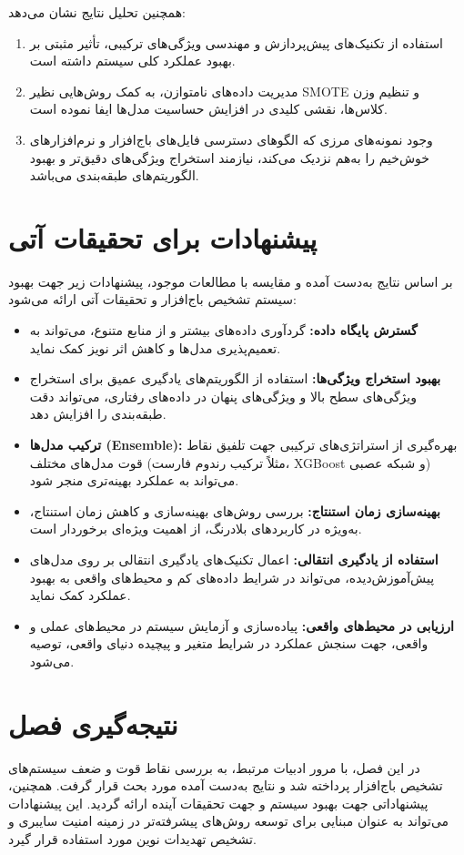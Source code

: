 همچنین تحلیل نتایج نشان می‌دهد:
\begin{enumerate}
    \item استفاده از تکنیک‌های پیش‌پردازش و مهندسی ویژگی‌های ترکیبی، تأثیر مثبتی بر بهبود عملکرد کلی سیستم داشته است.
    \item مدیریت داده‌های نامتوازن، به کمک روش‌هایی نظیر SMOTE و تنظیم وزن کلاس‌ها، نقشی کلیدی در افزایش حساسیت مدل‌ها ایفا نموده است.
    \item وجود نمونه‌های مرزی که الگوهای دسترسی فایل‌های باج‌افزار و نرم‌افزارهای خوش‌خیم را به‌هم نزدیک می‌کند، نیازمند استخراج ویژگی‌های دقیق‌تر و بهبود الگوریتم‌های طبقه‌بندی می‌باشد.
\end{enumerate}

\section{پیشنهادات برای تحقیقات آتی}
بر اساس نتایج به‌دست آمده و مقایسه با مطالعات موجود، پیشنهادات زیر جهت بهبود سیستم تشخیص باج‌افزار و تحقیقات آتی ارائه می‌شود:
\begin{itemize}
    \item \textbf{گسترش پایگاه داده:} گردآوری داده‌های بیشتر و از منابع متنوع، می‌تواند به تعمیم‌پذیری مدل‌ها و کاهش اثر نویز کمک نماید.
    \item \textbf{بهبود استخراج ویژگی‌ها:} استفاده از الگوریتم‌های یادگیری عمیق برای استخراج ویژگی‌های سطح بالا و ویژگی‌های پنهان در داده‌های رفتاری، می‌تواند دقت طبقه‌بندی را افزایش دهد.
    \item \textbf{ترکیب مدل‌ها (Ensemble):} بهره‌گیری از استراتژی‌های ترکیبی جهت تلفیق نقاط قوت مدل‌های مختلف (مثلاً ترکیب رندوم فارست، XGBoost و شبکه عصبی) می‌تواند به عملکرد بهینه‌تری منجر شود.
    \item \textbf{بهینه‌سازی زمان استنتاج:} بررسی روش‌های بهینه‌سازی و کاهش زمان استنتاج، به‌ویژه در کاربردهای بلادرنگ، از اهمیت ویژه‌ای برخوردار است.
    \item \textbf{استفاده از یادگیری انتقالی:} اعمال تکنیک‌های یادگیری انتقالی بر روی مدل‌های پیش‌آموزش‌دیده، می‌تواند در شرایط داده‌های کم و محیط‌های واقعی به بهبود عملکرد کمک نماید.
    \item \textbf{ارزیابی در محیط‌های واقعی:} پیاده‌سازی و آزمایش سیستم در محیط‌های عملی و واقعی، جهت سنجش عملکرد در شرایط متغیر و پیچیده دنیای واقعی، توصیه می‌شود.
\end{itemize}

\section{نتیجه‌گیری فصل}
در این فصل، با مرور ادبیات مرتبط، به بررسی نقاط قوت و ضعف سیستم‌های تشخیص باج‌افزار پرداخته شد و نتایج به‌دست آمده مورد بحث قرار گرفت. همچنین، پیشنهاداتی جهت بهبود سیستم و جهت تحقیقات آینده ارائه گردید. این پیشنهادات می‌تواند به عنوان مبنایی برای توسعه روش‌های پیشرفته‌تر در زمینه امنیت سایبری و تشخیص تهدیدات نوین مورد استفاده قرار گیرد.

